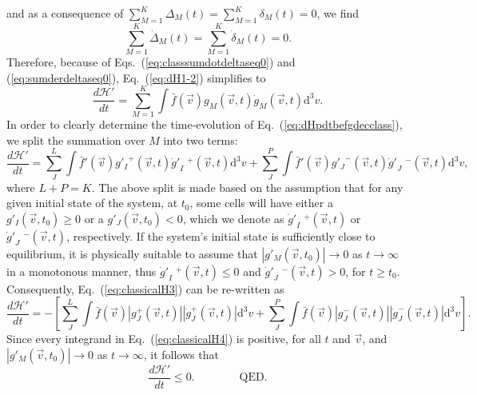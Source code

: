 %
and as a consequence of $\sum_{M=1}^{K} \Delta_M(t) =\sum_{M=1}^{K} \delta_M(t) =0$,
we find
%
\begin{equation}\label{eq:sumderdeltaseq0}
    \sum_{M=1}^{K} \dot{\Delta}_M(t)  =\sum_{M=1}^{K} \dot{\delta}_{M}(t) =0.
\end{equation}
%
Therefore, because of
Eqs.~(\ref{eq:classsumdotdeltaseq0}) and (\ref{eq:sumderdeltaseq0}), Eq.~(\ref{eq:dH1-2}) simplifies to
%
\begin{equation}\label{eq:dHpdtbefgdecclass}
  \frac{d\mathcal{H}'}{dt} = \sum_{M=1}^{K}\int\bar f(\vec{v})g_M(\vec{v},t)\dot g_M(\vec{v},t)\mathrm{d}^3v.
\end{equation}
%
In order to clearly determine the time-evolution of Eq.~(\ref{eq:dHpdtbefgdecclass}),
we split the summation over $M$ into two terms:
%
\begin{equation}\label{eq:classicalH3}
    \frac{d\mathcal{H}'}{dt}=\sum_J^{L}\int
      \bar f'(\vec{v}){g'_I}^{+}(\vec{v},t){{\dot{g}}'}_I\phantom{.}\!^{+}(\vec{v},t)\mathrm{d}^3v
        +\sum_J^{P}\int
      \bar f'(\vec{v}){g'_J}^{-}(\vec{v},t){{\dot{g}}'}_J\phantom{.}\!^{-}(\vec{v},t)\mathrm{d}^3v,
\end{equation}
%
where $L+P=K$. The above split is made based on the assumption that for any given initial
state of the system, at $t_0$, some cells will have either a $g'_I(\vec{v},t_0)\geq0$
or a $g'_J(\vec{v},t_0)<0$,
which we denote as ${{\dot{g}}'}_I\phantom{.}\!^{+}(\vec{v},t)$
or ${{\dot{g}}'}_J\phantom{.}\!^{-}(\vec{v},t)$, respectively.
%
%
If the system's initial state is sufficiently close to equilibrium, it is
physically suitable
to assume that $\left|g'_M(\vec{v},t_0)\right|\to 0$ as $t\to\infty$ in a monotonous manner,
thus ${{\dot{g}}'}_I\phantom{.}\!^{+}(\vec{v},t)\leq0$ and
${{\dot{g}}'}_J\phantom{.}\!^{-}(\vec{v},t)>0$, for $t\geq t_0$. Consequently,
Eq.~(\ref{eq:classicalH3}) can be re-written as
%
\begin{equation}\label{eq:classicalH4}
    \frac{d\mathcal{H}'}{dt}=-\left[
      \sum_J^{L}\int\bar f(\vec{v})|g_J^{+}(\vec{v},t)|
        |\dot g_J^{+}(\vec{v},t)|\mathrm{d}^3v
      +\sum_J^{P}\int\bar f(\vec{v})|g_J^{-}(\vec{v},t)|
      |\dot g_J^{-}(\vec{v},t)|\mathrm{d}^3v 
    \right].
\end{equation}
%
Since every integrand in Eq.~(\ref{eq:classicalH4}) is positive,
for all $t$ and $\vec v$, and
$\left|g'_M(\vec{v},t_0)\right|\to 0$ as $t\to\infty$, it follows that
%
\begin{equation}\label{eq:dHpdtleq0}
 \frac{d\mathcal{H}'}{dt}\leq0.\qquad\qquad\textrm{QED.}
\end{equation}
%

